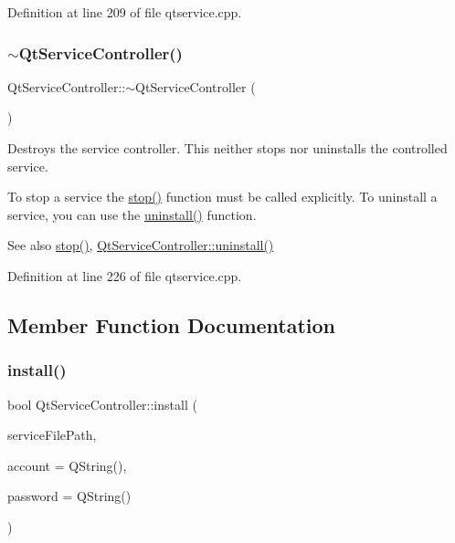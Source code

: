 Definition at line 209 of file qtservice.\+cpp.

\mbox{\label{class_qt_service_controller_a3288eead2b9862c3a70e7decbaebc908}} 
\subsubsection{\texorpdfstring{$\sim$\+Qt\+Service\+Controller()}{~QtServiceController()}}
{\footnotesize\ttfamily Qt\+Service\+Controller\+::$\sim$\+Qt\+Service\+Controller (\begin{DoxyParamCaption}{ }\end{DoxyParamCaption})\hspace{0.3cm}{\ttfamily [virtual]}}

Destroys the service controller. This neither stops nor uninstalls the controlled service.

To stop a service the \mbox{\hyperlink{class_qt_service_controller_ad06afa647666769e309474b18bf7cf90}{stop()}} function must be called explicitly. To uninstall a service, you can use the \mbox{\hyperlink{class_qt_service_controller_a25cd2f1f6868ece5de77976eb55cb74c}{uninstall()}} function.

\begin{DoxySeeAlso}{See also}
\mbox{\hyperlink{class_qt_service_controller_ad06afa647666769e309474b18bf7cf90}{stop()}}, \mbox{\hyperlink{class_qt_service_controller_a25cd2f1f6868ece5de77976eb55cb74c}{Qt\+Service\+Controller\+::uninstall()}} 
\end{DoxySeeAlso}


Definition at line 226 of file qtservice.\+cpp.



\subsection{Member Function Documentation}
\mbox{\label{class_qt_service_controller_a7e2b85e911ff152557dd25959e76094b}} 
\subsubsection{\texorpdfstring{install()}{install()}}
{\footnotesize\ttfamily bool Qt\+Service\+Controller\+::install (\begin{DoxyParamCaption}\item[{const Q\+String \&}]{service\+File\+Path,  }\item[{const Q\+String \&}]{account = {\ttfamily QString()},  }\item[{const Q\+String \&}]{password = {\ttfamily QString()} }\end{DoxyParamCaption})\hspace{0.3cm}{\ttfamily [static]}}

